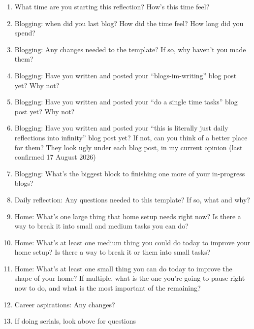 \documentclass[12pt]{article}
\newcommand{\say}[1]{``#1''}
\renewcommand{\,}{\textsuperscript{,}}
\begin{document}
\begin{enumerate}

\item What time are you starting this reflection? How's this time feel?

\item Blogging: when did you last blog? How did the time feel? How long did you spend?

\item Blogging: Any changes needed to the template? If so, why haven't you made them?

\item Blogging: Have you written and posted your \say{blogs-im-writing} blog post yet? Why not?

\item Blogging: Have you written and posted your \say{do a single time tasks} blog post yet? Why not?

\item Blogging: Have you written and posted your \say{this is literally just daily reflections into infinity} blog post yet? If not, can you think of a better place for them? They look ugly under each blog post, in my current opinion (last confirmed 17 August 2026)

\item Blogging: What's the biggest block to finishing one more of your in-progress blogs?

\item Daily reflection: Any questions needed to this template? If so, what and why?

\item Home: What's one large thing that home setup needs right now? Is there a way to break it into small and medium tasks you can do?

\item Home: What's at least one medium thing you could do today to improve your home setup? Is there a way to break it or them into small tasks?

\item Home: What's at least one small thing you can do today to improve the shape of your home? If multiple, what is the one you're going to pause right now to do, and what is the most important of the remaining?

\item Career aspirations: Any changes?

\item If doing serials, look above for questions


\end{enumerate}
\end{document}
